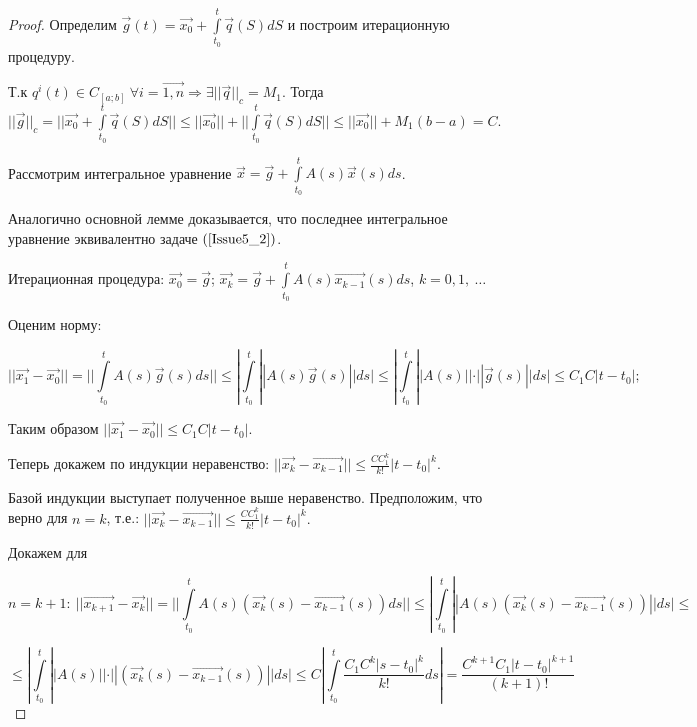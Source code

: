 \begin{proof}

Определим $\overrightarrow{g}(t) = \overrightarrow{x_0} + \int\limits_{t_0}^{t} \overrightarrow{q}(S)dS$ и построим итерационную процедуру.

Т.к $q^i(t) \in C_{[a;b]}\ \forall i = \overrightarrow{1,n} \Rightarrow \exists ||\overrightarrow{q}||_c = M_1.$ Тогда $||\overrightarrow{g}||_c = ||\overrightarrow{x_0} + \int\limits_{t_0}^{t}\overrightarrow{q}(S)dS|| \leqslant ||\overrightarrow{x_0}|| + ||\int\limits_{t_0}^{t}\overrightarrow{q}(S)dS|| \leqslant ||\overrightarrow{x_0}|| + M_1(b-a) = C.$

Рассмотрим интегральное уравнение $\overrightarrow{x} = \overrightarrow{g} + \int\limits_{t_0}^{t}A(s)\overrightarrow{x}(s)ds$.

Аналогично основной лемме доказывается, что последнее интегральное уравнение эквивалентно задаче $(\ref{Issue5_2})$.

Итерационная процедура: $\overrightarrow{x_0} = \overrightarrow{g}$; $\overrightarrow{x_k} = \overrightarrow{g} + \int\limits_{t_0}^{t} A(s)\overrightarrow{x_{k-1}}(s)ds $, $k = 0,1,\ \dots$

Оценим норму:

$$ ||\overrightarrow{x_1} - \overrightarrow{x_0}|| = || \int\limits_{t_0}^{t} A(s)\overrightarrow{g}(s)ds || \leqslant | \int\limits_{t_0}^{t} ||A(s)\overrightarrow{g}(s)||ds | \leqslant  | \int\limits_{t_0}^{t} ||A(s)||\cdot ||\overrightarrow{g}(s)||ds | \leqslant C_1 C |t - t_0|;$$ 

Таким образом $||\overrightarrow{x_1} -\overrightarrow{x_0}|| \leqslant C_1C|t-t_0|.$

Теперь докажем по индукции неравенство: $||\overrightarrow{x_k} - \overrightarrow{x_{k-1}}|| \leqslant \frac{CC_1^k}{k!}|t-t_0|^k.$

Базой индукции выступает полученное выше неравенство. Предположим, что верно для $n = k$, т.е.: $||\overrightarrow{x_k} - \overrightarrow{x_{k-1}}|| \leqslant \frac{CC_1^k}{k!}|t-t_0|^k.$

Докажем для 

\[n = k + 1:\  ||\overrightarrow{x_{k+1}} - \overrightarrow{x_{k}}|| = || \int\limits_{t_0}^{t} A(s)(\overrightarrow{x_k}(s) - \overrightarrow{x_{k-1}}(s))ds || \leqslant | \int\limits_{t_0}^{t} ||A(s)(\overrightarrow{x_k}(s) - \overrightarrow{x_{k-1}}(s))|| ds | \leqslant \]

\[ \leqslant | \int\limits_{t_0}^{t} ||A(s)||\cdot ||(\overrightarrow{x_k}(s) - \overrightarrow{x_{k-1}}(s))|| ds | \leqslant C |\int\limits_{t_0}^{t} \frac{C_1C^k|s-t_0|^k}{k!}ds | = \frac{C^{k+1}C_1|t-t_0|^{k+1}}{(k+1)!} \]


\end{proof}
